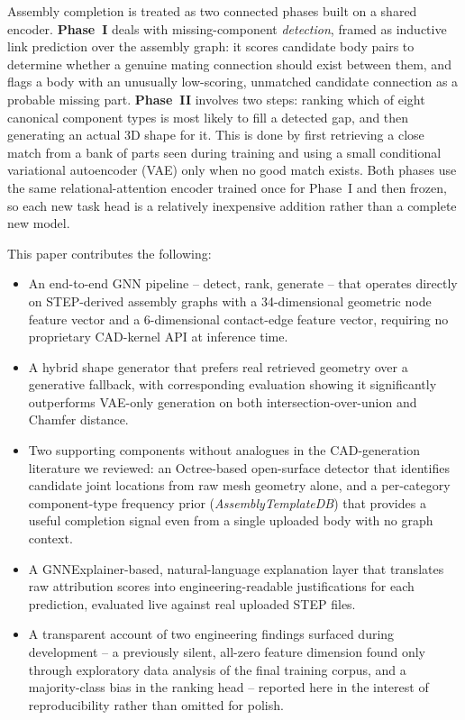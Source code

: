 \documentclass[sn-mathphys,Numbered]{sn-jnl}
\begin{document}
Assembly completion is treated as two connected phases built on a shared encoder. \textbf{Phase~I} deals with missing-component \emph{detection}, framed as inductive link prediction over the assembly graph: it scores candidate body pairs to determine whether a genuine mating connection should exist between them, and flags a body with an unusually low-scoring, unmatched candidate connection as a probable missing part. \textbf{Phase~II} involves two steps: ranking which of eight canonical component types is most likely to fill a detected gap, and then generating an actual 3D shape for it. This is done by first retrieving a close match from a bank of parts seen during training and using a small conditional variational autoencoder (VAE) only when no good match exists. Both phases use the same relational-attention encoder trained once for Phase~I and then frozen, so each new task head is a relatively inexpensive addition rather than a complete new model.

This paper contributes the following:
\begin{itemize}
\item An end-to-end GNN pipeline -- detect, rank, generate -- that operates directly on STEP-derived assembly graphs with a 34-dimensional geometric node feature vector and a 6-dimensional contact-edge feature vector, requiring no proprietary CAD-kernel API at inference time.
\item A hybrid shape generator that prefers real retrieved geometry over a generative fallback, with corresponding evaluation showing it significantly outperforms VAE-only generation on both intersection-over-union and Chamfer distance.
\item Two supporting components without analogues in the CAD-generation literature we reviewed: an Octree-based open-surface detector that identifies candidate joint locations from raw mesh geometry alone, and a per-category component-type frequency prior (\textit{AssemblyTemplateDB}) that provides a useful completion signal even from a single uploaded body with no graph context.
\item A GNNExplainer-based, natural-language explanation layer that translates raw attribution scores into engineering-readable justifications for each prediction, evaluated live against real uploaded STEP files.
\item A transparent account of two engineering findings surfaced during development -- a previously silent, all-zero feature dimension found only through exploratory data analysis of the final training corpus, and a majority-class bias in the ranking head -- reported here in the interest of reproducibility rather than omitted for polish.
\end{itemize}
\end{document}
